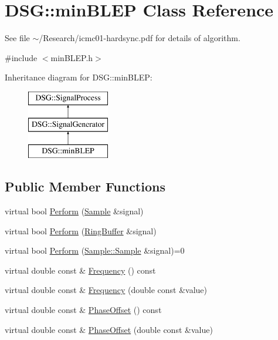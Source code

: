 \hypertarget{classDSG_1_1minBLEP}{\section{D\+S\+G\+:\+:min\+B\+L\+E\+P Class Reference}
\label{classDSG_1_1minBLEP}
}


See file $\sim$/\+Research/icmc01-\/hardsync.pdf for details of algorithm.  




{\ttfamily \#include $<$min\+B\+L\+E\+P.\+h$>$}

Inheritance diagram for D\+S\+G\+:\+:min\+B\+L\+E\+P\+:\begin{figure}[H]
\begin{center}
\leavevmode
\includegraphics[height=3.000000cm]{classDSG_1_1minBLEP}
\end{center}
\end{figure}
\subsection*{Public Member Functions}
\begin{DoxyCompactItemize}
\item 
virtual bool \hyperlink{classDSG_1_1SignalGenerator_a95d485b68d874938ac93644b121607b9}{Perform} (\hyperlink{classDSG_1_1Sample}{Sample} \&signal)
\item 
virtual bool \hyperlink{classDSG_1_1SignalGenerator_abaa9aecd00b792d46166b91524b42db6}{Perform} (\hyperlink{classDSG_1_1RingBuffer}{Ring\+Buffer} \&signal)
\item 
virtual bool \hyperlink{classDSG_1_1SignalProcess_afdb8220100418893950c1161dd24db67}{Perform} (\hyperlink{classDSG_1_1Sample_aaf2e30d73911eccea99b53eeee15b612}{Sample\+::\+Sample} \&signal)=0
\item 
virtual double const \& \hyperlink{classDSG_1_1SignalGenerator_aedac746c5a70818d120858542ecb7c45}{Frequency} () const 
\item 
virtual double const \& \hyperlink{classDSG_1_1SignalGenerator_ae3ce8d45bafabbd86a0f535b15c3cd46}{Frequency} (double const \&value)
\item 
virtual double const \& \hyperlink{classDSG_1_1SignalGenerator_a1ce521847edd0b837fd840998f906b4b}{Phase\+Offset} () const 
\item 
virtual double const \& \hyperlink{classDSG_1_1SignalGenerator_a08b71b1f30ba65e629642c570291dc0e}{Phase\+Offset} (double const \&value)
\end{DoxyCompactItemize}
